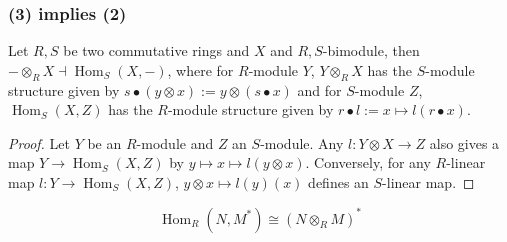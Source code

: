 \documentclass[aspectratio=169]{beamer}
\begin{document}
\begin{frame}[fragile]
\frametitle{(3) implies (2)}
\begin{minipage}{0.1\textwidth}
\end{minipage}%
\begin{minipage}{0.9\textwidth}
\begin{theorem}
Let $R, S$ be two commutative rings and $X$ and $R,S$-bimodule, then
$-\otimes_R X\dashv \operatorname{Hom}_S(X, -)$, where for $R$-module $Y$, 
$Y \otimes_R X$ has the $S$-module structure given by $s \bullet (y \otimes x) := y \otimes (s \bullet x)$ 
and for $S$-module $Z$, $\operatorname{Hom}_S(X, Z)$ has the $R$-module structure
given by $r \bullet l := x \mapsto l (r \bullet x)$.
\end{theorem}
\begin{proof}
Let $Y$ be an $R$-module and $Z$ an $S$-module. 
Any $l : Y\otimes X \to Z$ also gives a map $Y\to \operatorname{Hom}_S(X, Z)$
by $y \mapsto x \mapsto l (y \otimes x)$. Conversely, for any $R$-linear map 
$l : Y\to \operatorname{Hom}_S(X, Z)$, $y\otimes x \mapsto l(y)(x)$ defines an 
$S$-linear map.
\end{proof}

\begin{corollary}
\[
  \operatorname{Hom}_R(N, M^*)\cong (N\otimes_R M)^*
\]
\end{corollary}

\end{minipage}%

\end{frame}
\end{document}
